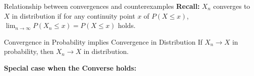 \documentclass [aspectratio=169]{beamer}
\begin{document}
\begin{frame}{Relationship between convergences and counterexamples}
    \textbf{Recall:} $X_n$ converges to $X$ in distribution if for any continuity point $x$ of $P(X\leq x)$, $\lim_{n\to \infty}P(X_n \leq x) = P(X\leq x)$ holds.\\
    \begin{block}{Convergence in Probability implies Convergence in Distribution}
    If $X_n \to X$ in probability, then $X_n \to X$ in distribution. 
    \end{block}
    \textbf{Special case when the Converse holds: }
    \vspace{1.8in}
\end{frame}
\end{document}
